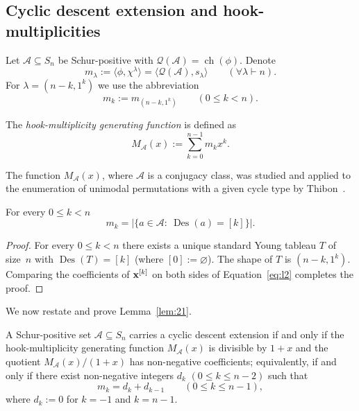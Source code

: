 \documentclass[ALCO,published]{cedram}
\newcommand{\Q}{\mathcal Q}
\newcommand{\A}{\mathcal A}
\DeclareMathOperator\Des{Des}
\newcommand{\ch}{{\operatorname{ch}}}
\newcommand{\card}[1]{\ensuremath{\left|#1\right|}}
\begin{document}
\subsection{Cyclic descent extension and hook-multiplicities}\label{sec:hook_criterion}
	
Let $\A\subseteq S_n$ be Schur-positive with $\Q(\A) = \ch(\phi)$.
Denote
\[
    m_\lambda 
    := \langle \phi, \chi^\lambda \rangle 
    = \langle \Q(\A), s_\lambda \rangle
\qquad (\forall \lambda \vdash n).
\]
For $\lambda = (n-k,1^k)$ we use the abbreviation 
\[
m_k := m_{(n-k,1^k)} 
\qquad (0 \le k < n).
\]

The {\em hook-multiplicity generating function} is defined as 
\[
M_{\A}(x):=\sum_{k=0}^{n-1} m_k x^k.
\]

The function $M_{\A}(x)$, where $\A$ 
is a conjugacy class, 
was studied and applied to the enumeration of unimodal permutations with a given cycle type by Thibon~\cite{Thibon}. 

\begin{observation}\label{lem:1}
    For every $0\le k <n$
    \[
        m_k = \card{\{a\in \A:\ \Des(a)=[k]\}}.
    \]
\end{observation}

\begin{proof}
    For every $0 \le k < n$ there exists 
    a unique standard Young tableau $T$ of size~$n$ with
    $\Des(T) = [k]$ (where $[0] := \varnothing$). 
    The shape of $T$ is $(n-k,1^k)$.
    Comparing the coefficients of ${\bf x}^{[k]}$ on both sides of Equation~\eqref{eq:l2} completes the proof.
\end{proof}

We now restate and prove Lemma~\ref{lem:21}.

\begin{lemma}\label{lem:2}
    A Schur-positive set $\A \subseteq S_n$ carries a cyclic descent extension if and only if 
    the hook-multiplicity generating function $M_\A(x)$ 
    is divisible by $1+x$
    and the quotient $M_\A(x)/(1+x)$ has non-negative coefficients; 
    equivalently, if and only if
    there exist non-negative integers $d_k$ $(0 \le k \le n-2)$ such that
    \[
        m_k = d_k + d_{k-1} \qquad (0 \le k \le n-1),
    \]
    where $d_k := 0$ for $k = -1$ and $k = n-1$.
\end{lemma}
	
\end{document}
